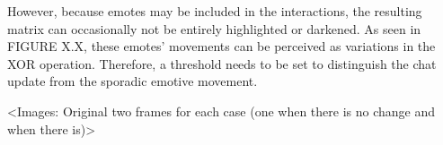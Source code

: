 
    However, because emotes may be included in the interactions, the resulting matrix can occasionally not be entirely highlighted or darkened. As seen in FIGURE X.X, these emotes' movements can be perceived as variations in the \gls{XOR} operation. Therefore, a threshold needs to be set to distinguish the chat update from the sporadic emotive movement.

    <Images: Original two frames for each case (one when there is no change and when there is)>

    

    

    

    